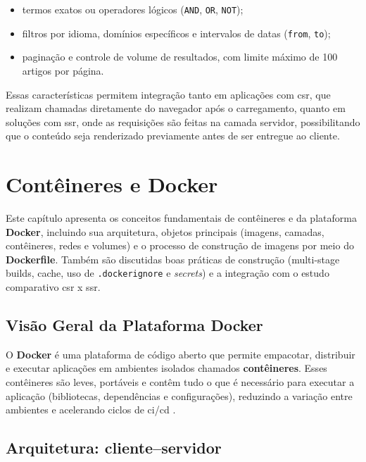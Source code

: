 \begin{itemize}
    \item termos exatos ou operadores lógicos (\texttt{AND}, \texttt{OR}, \texttt{NOT});
    \item filtros por idioma, domínios específicos e intervalos de datas (\texttt{from}, \texttt{to});
    \item paginação e controle de volume de resultados, com limite máximo de 100 artigos por página.
\end{itemize}

Essas características permitem integração tanto em aplicações com \acrshort{csr}, que realizam chamadas diretamente do navegador após o carregamento, quanto em soluções com \acrshort{ssr}, onde as requisições são feitas na camada servidor, possibilitando que o conteúdo seja renderizado previamente antes de ser entregue ao cliente.






\section{Contêineres e Docker}
\label{cap:docker}

Este capítulo apresenta os conceitos fundamentais de contêineres e da plataforma \textbf{Docker}, incluindo sua arquitetura, objetos principais (imagens, camadas, contêineres, redes e volumes) e o processo de construção de imagens por meio do \textbf{Dockerfile}. Também são discutidas boas práticas de construção (multi-stage builds, cache, uso de \texttt{.dockerignore} e \textit{secrets}) e a integração com o estudo comparativo \acrshort{csr} x \acrshort{ssr}. \cite{docker_overview,dockerfile_ref} 

\subsection{Visão Geral da Plataforma Docker}
\label{sec:docker-overview}

O \textbf{Docker} é uma plataforma de código aberto que permite empacotar, distribuir e executar aplicações em ambientes isolados chamados \textbf{contêineres}. Esses contêineres são leves, portáveis e contêm tudo o que é necessário para executar a aplicação (bibliotecas, dependências e configurações), reduzindo a variação entre ambientes e acelerando ciclos de \acrshort{ci}/\acrshort{cd} \cite{docker_overview}. 

\subsection{Arquitetura: cliente–servidor}
\label{subsec:docker-arquitetura}

